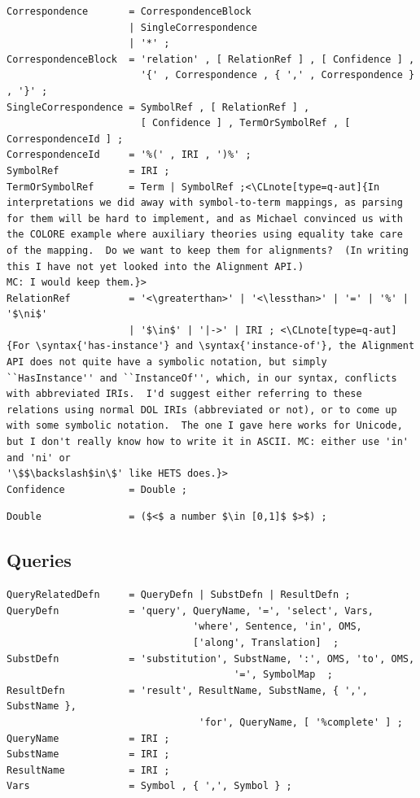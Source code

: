 \documentclass[10pt,%
\ifpretendfinal
final%
\else
draft%
\fi,
]{scrreprt}
\makeatletter
\newcommand*\CommentAuthor{}
\renewcommand*\CommentAuthor{#1}}
\newcommand*\CommentDate{}
\renewcommand*\CommentDate{#1}}
\newcommand*\CommentId{}
\renewcommand*\CommentId{#1}}
\newcommand*\CommentType{}
\renewcommand*\CommentType{#1}}
\newcommand*{\SetCommentColorByType}[1]{%
\edef\localType{{#1}}%
\expandafter\ifstrequal\localType{q-aut}{\colorlet{CommentColor}{red}}{%
\expandafter\ifstrequal\localType{q-all}{\colorlet{CommentColor}{orange}}{%
\expandafter\ifstrequal\localType{todo}{\colorlet{CommentColor}{orange}}{%
\expandafter\ifstrequal\localType{fyi}{\colorlet{CommentColor}{lightgray}}{%
\colorlet{CommentColor}{yellow}}}}}}
\newcommand*{\SetCommentPrefixByType}[1]{%
\edef\localType{{#1}}%
\expandafter\@ifmtarg\localType{%
\edef\CommentPrefix{}%
}{%
\caseupper[q]{#1}%
\edef\CommentPrefix{\thestring: }%
}}
\newcommand*{\initComment}[1]{%
\setkeys{Comment}{#1}%
\SetCommentColorByType{\CommentType}%
\relax%
\SetCommentPrefixByType{\CommentType}%
\relax%
}
\newcommand*{\todonote}[2][]{%
\initComment{#1}%
\pdfcomment[author=\CommentAuthor,color=CommentColor,date=\CommentDate,id=\CommentId]{%
\CommentPrefix
#2}}
\renewcommand*{\todonote}[2][]{%
\initComment{#1}%
\ednote{\CommentPrefix #2}}
\newcommand*{\CLnote}[2][author=Christoph Lange]{%
\todonote[author=Christoph Lange,#1]{#2} 
}
\newcommand*{\syntax}[1]{\texttt{#1}}
\newcommand{\ssclause}[1]{\subsection{#1}}
\newcommand{\red}[1]{{\color{red}{#1}}}
\makeatother
\begin{document}
\begin{lstlisting}[language=ebnf,escapeinside={<>},mathescape]
Correspondence       = CorrespondenceBlock
                     | SingleCorrespondence
                     | '*' ;
CorrespondenceBlock  = 'relation' , [ RelationRef ] , [ Confidence ] , 
                       '{' , Correspondence , { ',' , Correspondence } , '}' ;
SingleCorrespondence = SymbolRef , [ RelationRef ] ,
                       [ Confidence ] , TermOrSymbolRef , [ CorrespondenceId ] ;
CorrespondenceId     = '%(' , IRI , ')%' ;
SymbolRef            = IRI ;
TermOrSymbolRef      = Term | SymbolRef ;<\CLnote[type=q-aut]{In interpretations we did away with symbol-to-term mappings, as parsing for them will be hard to implement, and as Michael convinced us with the COLORE example where auxiliary theories using equality take care of the mapping.  Do we want to keep them for alignments?  (In writing this I have not yet looked into the Alignment API.)
MC: I would keep them.}>
RelationRef          = '<\greaterthan>' | '<\lessthan>' | '=' | '%' | '$\ni$' 
                     | '$\in$' | '|->' | IRI ; <\CLnote[type=q-aut]{For \syntax{'has-instance'} and \syntax{'instance-of'}, the Alignment API does not quite have a symbolic notation, but simply ``HasInstance'' and ``InstanceOf'', which, in our syntax, conflicts with abbreviated IRIs.  I'd suggest either referring to these relations using normal DOL IRIs (abbreviated or not), or to come up with some symbolic notation.  The one I gave here works for Unicode, but I don't really know how to write it in ASCII. MC: either use 'in' and 'ni' or 
'\$$\backslash$in\$' like HETS does.}>
Confidence           = Double ; 
\end{lstlisting}
\begin{lstlisting}[language=ebnf,escapeinside={()}]
Double               = ($<$ a number $\in [0,1]$ $>$) ;
\end{lstlisting}

\ssclause{Queries}
\red{new!!!!!!!!!!!!!!!!!!!!!!!!!!!!!!!!!!!!!!!!!!}
\begin{lstlisting}[language=ebnf,escapeinside={<>},mathescape]
QueryRelatedDefn     = QueryDefn | SubstDefn | ResultDefn ;
QueryDefn            = 'query', QueryName, '=', 'select', Vars, 
                                'where', Sentence, 'in', OMS, 
                                ['along', Translation]  ;
SubstDefn            = 'substitution', SubstName, ':', OMS, 'to', OMS, 
                                       '=', SymbolMap  ;
ResultDefn           = 'result', ResultName, SubstName, { ',', SubstName },
                                 'for', QueryName, [ '%complete' ] ;
QueryName            = IRI ;
SubstName            = IRI ;
ResultName           = IRI ;
Vars                 = Symbol , { ',', Symbol } ;
\end{lstlisting}
\end{document}
